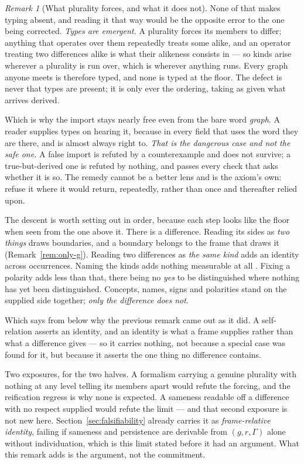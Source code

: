 \documentclass[11pt,a4paper]{article}
\theoremstyle{remark}\newtheorem{remark}[definition]{Remark}
\begin{document}
\begin{remark}[What plurality forces, and what it does not]
None of that makes typing absent, and reading it that way would be the opposite error to the one being
corrected. \emph{Types are emergent.} A plurality forces its members to differ; anything that operates
over them repeatedly treats some alike, and an operator treating two differences alike is what their
alikeness consists in --- so kinds arise wherever a plurality is run over, which is wherever anything
runs. Every graph anyone meets is therefore typed, and none is typed at the floor. The defect is never
that types are present; it is only ever the ordering, taking as given what arrives derived.

Which is why the import stays nearly free even from the bare word \emph{graph}. A reader supplies types
on hearing it, because in every field that uses the word they are there, and is almost always right to.
\emph{That is the dangerous case and not the safe one.} A false import is refuted by a counterexample
and does not survive; a true-but-derived one is refuted by nothing, and passes every check that asks
whether it is so. The remedy cannot be a better lens and is the axiom's own: refuse it where it would
return, repeatedly, rather than once and thereafter relied upon.

The descent is worth setting out in order, because each step looks like the floor when seen from the
one above it. There is a difference. Reading its sides as \emph{two things} draws boundaries, and a
boundary belongs to the frame that draws it (Remark~\ref{rem:only-g}). Reading two differences as
\emph{the same kind} adds an identity across occurrences. Naming the kinds adds nothing measurable at
all \citep{shannon1948}. Fixing a polarity adds less than that, there being no \emph{yes} to be
distinguished where nothing has yet been distinguished. Concepts, names, signs and polarities stand on
the supplied side together; \emph{only the difference does not}.

Which says from below why the previous remark came out as it did. A self-relation asserts an identity,
and an identity is what a frame supplies rather than what a difference gives --- so it carries nothing,
not because a special case was found for it, but because it asserts the one thing no difference
contains.

Two exposures, for the two halves. A formalism carrying a genuine plurality with nothing at any level
telling its members apart would refute the forcing, and the reification regress is why none is
expected. A sameness readable off a difference with no respect supplied would refute the limit --- and
that second exposure is not new here. Section~\ref{sec:falsifiability} already carries it as
\emph{frame-relative identity}, failing if sameness and persistence are derivable from $(g,r,\Gamma)$
alone without individuation, which is this limit stated before it had an argument. What this remark
adds is the argument, not the commitment.
\end{remark}
\end{document}
